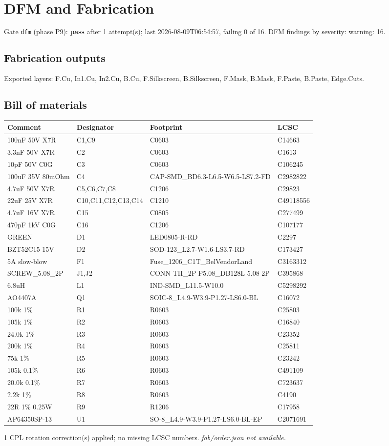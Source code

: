 \documentclass[11pt,a4paper]{article}
\begin{document}
\section{DFM and Fabrication}
Gate \texttt{dfm} (phase P9): \textbf{pass} after 1 attempt(s); last 2026-08-09T06:54:57, failing 0 of 16.
DFM findings by severity: warning: 16.
\subsection*{Fabrication outputs}
Exported layers: F.Cu, In1.Cu, In2.Cu, B.Cu, F.Silkscreen, B.Silkscreen, F.Mask, B.Mask, F.Paste, B.Paste, Edge.Cuts.
\subsection*{Bill of materials}
{\small
\begin{longtable}{p{4.4cm}p{2.8cm}p{4.6cm}l}
\toprule
\textbf{Comment} & \textbf{Designator} & \textbf{Footprint} & \textbf{LCSC} \\
\midrule
\endhead
100nF 50V X7R & C1,C9 & C0603 & C14663 \\
3.3nF 50V X7R & C2 & C0603 & C1613 \\
10pF 50V C0G & C3 & C0603 & C106245 \\
100uF 35V 80mOhm & C4 & CAP-SMD\_BD6.3-L6.5-W6.5-LS7.2-FD & C2982822 \\
4.7uF 50V X7R & C5,C6,C7,C8 & C1206 & C29823 \\
22uF 25V X7R & C10,C11,C12,C13,C14 & C1210 & C49118556 \\
4.7uF 16V X7R & C15 & C0805 & C277499 \\
470pF 1kV C0G & C16 & C1206 & C107177 \\
GREEN & D1 & LED0805-R-RD & C2297 \\
BZT52C15 15V & D2 & SOD-123\_L2.7-W1.6-LS3.7-RD & C173427 \\
5A slow-blow & F1 & Fuse\_1206\_C1T\_BelVendorLand & C3163312 \\
SCREW\_5.08\_2P & J1,J2 & CONN-TH\_2P-P5.08\_DB128L-5.08-2P & C395868 \\
6.8uH & L1 & IND-SMD\_L11.5-W10.0 & C5298292 \\
AO4407A & Q1 & SOIC-8\_L4.9-W3.9-P1.27-LS6.0-BL & C16072 \\
100k 1\% & R1 & R0603 & C25803 \\
105k 1\% & R2 & R0603 & C16840 \\
24.0k 1\% & R3 & R0603 & C23352 \\
200k 1\% & R4 & R0603 & C25811 \\
75k 1\% & R5 & R0603 & C23242 \\
105k 0.1\% & R6 & R0603 & C491109 \\
20.0k 0.1\% & R7 & R0603 & C723637 \\
2.2k 1\% & R8 & R0603 & C4190 \\
22R 1\% 0.25W & R9 & R1206 & C17958 \\
AP64350SP-13 & U1 & SO-8\_L4.9-W3.9-P1.27-LS6.0-BL-EP & C2071691 \\
\bottomrule
\end{longtable}
}
1 CPL rotation correction(s) applied; no missing LCSC numbers.
\emph{fab/order.json not available.}
\end{document}
